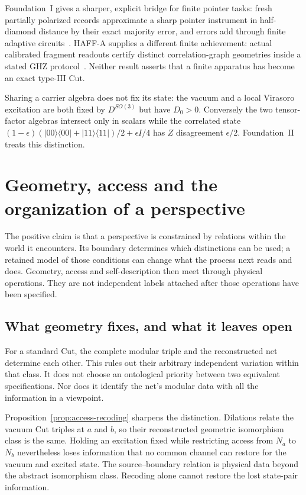 \documentclass[12pt]{article}
\theoremstyle{definition}
\theoremstyle{remark}
\begin{document}
Foundation~I gives a sharper, explicit bridge for finite pointer tasks:
fresh partially polarized records approximate a sharp pointer instrument in
half-diamond distance by their exact majority error, and errors add through
finite adaptive circuits~\cite{FoundationI}. HAFF-A supplies a different
finite achievement: actual calibrated fragment readouts certify distinct
correlation-graph geometries inside a stated GHZ protocol~\cite{PaperA}.
Neither result asserts that a finite apparatus has become an exact type-III Cut.

Sharing a carrier algebra does not fix its state: the vacuum and a
local Virasoro excitation are both fixed by $D^{SO(3)}$ but have
$D_0>0$. Conversely the two tensor-factor algebras intersect only
in scalars while the correlated state
$(1-\epsilon)(|00\rangle\langle00|+|11\rangle\langle11|)/2+\epsilon I/4$
has $Z$ disagreement $\epsilon/2$. Foundation~II treats this distinction.

\section{Geometry, access and the organization of a perspective}\label{sec:hard}

The positive claim is that a perspective is constrained by relations
within the world it encounters. Its boundary determines which
distinctions can be used; a retained model of those conditions can
change what the process next reads and does. Geometry, access and
self-description then meet through physical operations. They are not
independent labels attached after those operations have been specified.

\subsection{What geometry fixes, and what it leaves open}

For a standard Cut, the complete modular triple and the reconstructed
net determine each other. This rules out their arbitrary independent
variation within that class. It does not choose an ontological priority
between two equivalent specifications. Nor does it identify the net's
modular data with all the information in a viewpoint.

Proposition~\ref{prop:access-recoding} sharpens the distinction.
Dilations relate the vacuum Cut triples at \(a\) and \(b\), so their
reconstructed geometric isomorphism class is the same. Holding an
excitation fixed while restricting access from \(N_a\) to \(N_b\)
nevertheless loses information that no common channel can restore for
the vacuum and excited state. The source--boundary relation is physical
data beyond the abstract isomorphism class. Recoding alone cannot
restore the lost state-pair information.
\end{document}
